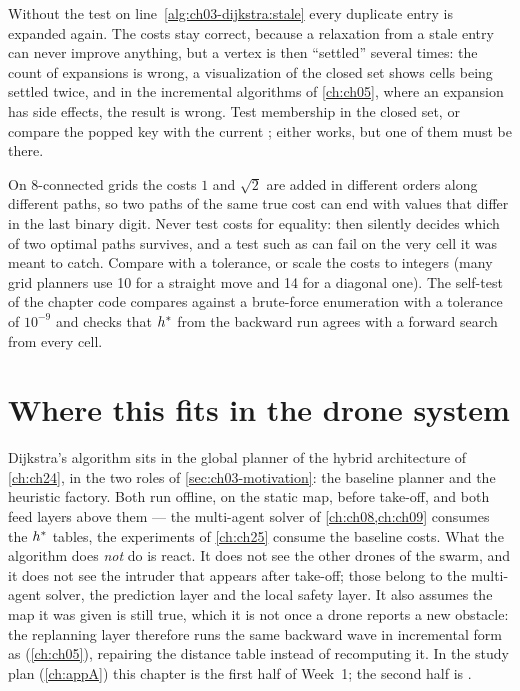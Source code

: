\begin{pitfall}
Without the test on line~\ref{alg:ch03-dijkstra:stale} every duplicate entry is expanded again.
The costs stay correct, because a relaxation from a stale entry can never improve anything, but
a vertex is then ``settled'' several times: the count of expansions is wrong, a visualization of
the closed set shows cells being settled twice, and in the incremental algorithms of
\cref{ch:ch05}, where an expansion has side effects, the result is wrong. Test membership in the
closed set, or compare the popped key with the current ; either works, but one of
them must be there.
\end{pitfall}

\begin{pitfall}
%
On 8-connected grids the costs $1$ and $\sqrt2$ are added in different orders along different
paths, so two paths of the same true cost can end with values that differ in the last binary
digit. Never test costs for equality:  then silently decides which of
two optimal paths survives, and a test such as  can fail on the very cell it
was meant to catch. Compare with a tolerance, or scale the costs to integers (many grid planners
use 10 for a straight move and 14 for a diagonal one). The self-test of the chapter code
compares against a brute-force enumeration with a tolerance of $10^{-9}$ and checks that
$h^*$ from the backward run agrees with a forward search from every cell.
\end{pitfall}

\section{Where this fits in the drone system}
\label{sec:ch03-drone}

\begin{dronebox}
%
Dijkstra's algorithm sits in the global planner of the hybrid architecture of
\cref{ch:ch24}, in the two roles of \cref{sec:ch03-motivation}: the baseline planner and the
heuristic factory. Both run offline, on the static map, before take-off, and both feed layers
above them --- the multi-agent solver of \cref{ch:ch08,ch:ch09} consumes the $h^*$ tables,
the experiments of \cref{ch:ch25} consume the baseline costs. What the algorithm does \emph{not}
do is react. It does not see the other drones of the swarm, and it does not see the intruder
that appears after take-off; those belong to the multi-agent solver, the prediction layer and
the local safety layer. It also assumes the map it was given is still true, which it is not
once a drone reports a new obstacle: the replanning layer therefore runs the same backward wave
in incremental form as \dstarlite (\cref{ch:ch05}), repairing the distance table instead of
recomputing it. In the study plan (\cref{ch:appA}) this chapter is the first half of Week~1; the
second half is \astar.
\end{dronebox}

